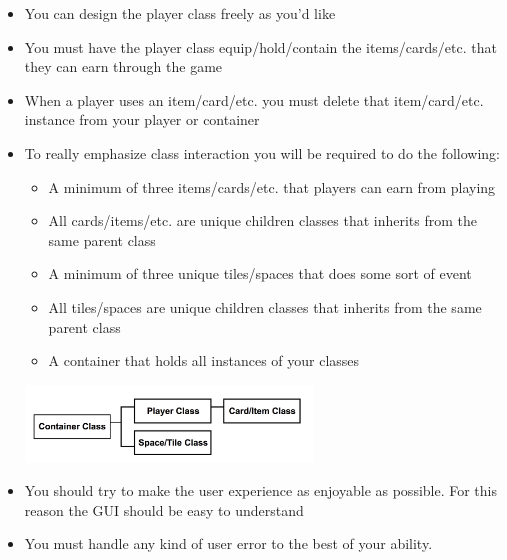 \documentclass{42-en}
\begin{document}
\begin{itemize}
		\item You can design the player class freely as you'd like
		\item You must have the player class equip/hold/contain the items/cards/etc. that
		they can earn through the game
		\item When a player uses an item/card/etc. you must delete that item/card/etc. instance from 
		your player or container
		\item To really emphasize class interaction you will be required to do the following:

		\begin{itemize}
			\item A minimum of three items/cards/etc. that players can earn from playing
			\item All cards/items/etc. are unique children classes that inherits from the same parent class
			\item A minimum of three unique tiles/spaces that does some sort of event
			\item All tiles/spaces are unique children classes that inherits from the same parent class
			\item A container that holds all instances of your classes
		\end{itemize}


		\begin{center}
			\includegraphics[width=0.6\textwidth]{images/container.png}
		\end{center}

		\item You should try to make the user experience as enjoyable as
		possible. For this reason the GUI should be easy to understand
		\item You must handle any kind of user error to the best of your
		ability. 
		
	\end{itemize}

\end{document}
